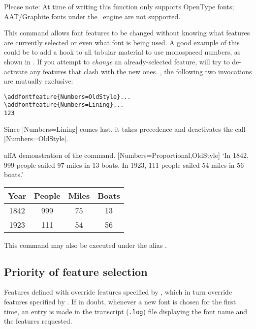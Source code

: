 \documentclass[a4paper]{l3doc}
\begin{document}
Please note: At time of writing this function only supports OpenType fonts; AAT/Graphite fonts under the \XeTeX\ engine are not supported.



This command allows font features to
be changed without knowing what features are currently selected or even what
font is being used. A good example of this could be to add a hook to all
tabular material to use monospaced numbers, as shown in .
If you attempt to \emph{change} an already-selected feature,  will try to de-activate any features that clash with the new ones.
\Eg, the following two invocations are mutually exclusive:
\begin{Verbatim}
\addfontfeature{Numbers=OldStyle}...
\addfontfeature{Numbers=Lining}...
123
\end{Verbatim}
Since |Numbers=Lining| comes last, it takes precedence and deactivates the call |Numbers=OldStyle|.

\begin{Lexample}{aff}{A demonstration of the  command.}
           [Numbers={Proportional,OldStyle}]
  `In 1842, 999 people sailed 97 miles in
   13 boats. In 1923, 111 people sailed 54
   miles in 56 boats.'            \bigskip

  {
  \begin{tabular}{@{} cccc @{}}
            Year & People & Miles & Boats \\
    \hline  1842 &  999   &  75   &  13   \\
            1923 &  111   &  54   &  56
  \end{tabular}}
\end{Lexample}

\DescribeMacro{\addfontfeature}
This command may also be executed under the alias \cmd{\addfontfeature}.


\subsection{Priority of feature selection}
Features defined with  override features
specified by , which in turn override features
specified by .  If in doubt, whenever a
new font is chosen for the first time, an entry is made in the
transcript (\texttt{.log}) file displaying the font name and the
features requested.
\end{document}
